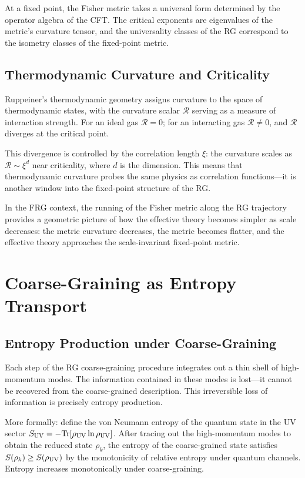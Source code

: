 \documentclass[12pt,a4paper,oneside]{book}
\theoremstyle{definition}
\theoremstyle{plain}
\theoremstyle{remark}
\begin{document}
At a fixed point, the Fisher metric takes a universal form determined by the
operator algebra of the CFT. The critical exponents are eigenvalues of the
metric's curvature tensor, and the universality classes of the RG correspond
to the isometry classes of the fixed-point metric.

\section{Thermodynamic Curvature and Criticality}

Ruppeiner's thermodynamic geometry assigns curvature to the space of
thermodynamic states, with the curvature scalar $\mathcal{R}$ serving as a
measure of interaction strength. For an ideal gas $\mathcal{R} = 0$; for an
interacting gas $\mathcal{R} \neq 0$, and $\mathcal{R}$ diverges at the
critical point.

This divergence is controlled by the correlation length $\xi$: the curvature
scales as $\mathcal{R} \sim \xi^d$ near criticality, where $d$ is the
dimension. This means that thermodynamic curvature probes the same physics
as correlation functions---it is another window into the fixed-point structure
of the RG.

In the FRG context, the running of the Fisher metric along the RG trajectory
provides a geometric picture of how the effective theory becomes simpler as
scale decreases: the metric curvature decreases, the metric becomes flatter,
and the effective theory approaches the scale-invariant fixed-point metric.

\chapter{Coarse-Graining as Entropy Transport}

\section{Entropy Production under Coarse-Graining}

Each step of the RG coarse-graining procedure integrates out a thin shell of
high-momentum modes. The information contained in these modes is lost---it
cannot be recovered from the coarse-grained description. This irreversible
loss of information is precisely entropy production.

More formally: define the von Neumann entropy of the quantum state in the
UV sector $S_{\rm UV} = -\mathrm{Tr}[\rho_{\rm UV}\ln\rho_{\rm UV}]$. After
tracing out the high-momentum modes to obtain the reduced state $\rho_k$,
the entropy of the coarse-grained state satisfies
$S(\rho_k) \geq S(\rho_{\rm UV})$ by the monotonicity of relative entropy
under quantum channels. Entropy increases monotonically under coarse-graining.
\end{document}
